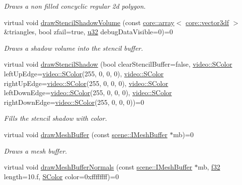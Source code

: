 \begin{DoxyCompactItemize}
\begin{DoxyCompactList}\small\item\em Draws a non filled concyclic regular 2d polygon. \end{DoxyCompactList}\item 
virtual void \hyperlink{classirr_1_1video_1_1IVideoDriver_ae340fe71939b7c1043071507f3330cad}{draw\+Stencil\+Shadow\+Volume} (const \hyperlink{classirr_1_1core_1_1array}{core\+::array}$<$ \hyperlink{namespaceirr_1_1core_ae6e2b2a6c552833ebbd5b7463d03586b}{core\+::vector3df} $>$ \&triangles, bool zfail=true, \hyperlink{namespaceirr_a0416a53257075833e7002efd0a18e804}{u32} debug\+Data\+Visible=0)=0
\begin{DoxyCompactList}\small\item\em Draws a shadow volume into the stencil buffer. \end{DoxyCompactList}\item 
virtual void \hyperlink{classirr_1_1video_1_1IVideoDriver_a985ea57c5cf23b7774044f6ed9f96579}{draw\+Stencil\+Shadow} (bool clear\+Stencil\+Buffer=false, \hyperlink{classirr_1_1video_1_1SColor}{video\+::\+S\+Color} left\+Up\+Edge=\hyperlink{classirr_1_1video_1_1SColor}{video\+::\+S\+Color}(255, 0, 0, 0), \hyperlink{classirr_1_1video_1_1SColor}{video\+::\+S\+Color} right\+Up\+Edge=\hyperlink{classirr_1_1video_1_1SColor}{video\+::\+S\+Color}(255, 0, 0, 0), \hyperlink{classirr_1_1video_1_1SColor}{video\+::\+S\+Color} left\+Down\+Edge=\hyperlink{classirr_1_1video_1_1SColor}{video\+::\+S\+Color}(255, 0, 0, 0), \hyperlink{classirr_1_1video_1_1SColor}{video\+::\+S\+Color} right\+Down\+Edge=\hyperlink{classirr_1_1video_1_1SColor}{video\+::\+S\+Color}(255, 0, 0, 0))=0
\begin{DoxyCompactList}\small\item\em Fills the stencil shadow with color. \end{DoxyCompactList}\item 
virtual void \hyperlink{classirr_1_1video_1_1IVideoDriver_ab09507d0b00502912b75e31d2c344e5c}{draw\+Mesh\+Buffer} (const \hyperlink{classirr_1_1scene_1_1IMeshBuffer}{scene\+::\+I\+Mesh\+Buffer} $\ast$mb)=0
\begin{DoxyCompactList}\small\item\em Draws a mesh buffer. \end{DoxyCompactList}\item 
virtual void \hyperlink{classirr_1_1video_1_1IVideoDriver_a1c2ba3fb555e3c7622f3124799440226}{draw\+Mesh\+Buffer\+Normals} (const \hyperlink{classirr_1_1scene_1_1IMeshBuffer}{scene\+::\+I\+Mesh\+Buffer} $\ast$mb, \hyperlink{namespaceirr_a0277be98d67dc26ff93b1a6a1d086b07}{f32} length=10.f, \hyperlink{classirr_1_1video_1_1SColor}{S\+Color} color=0xffffffff)=0

\end{DoxyCompactItemize}
